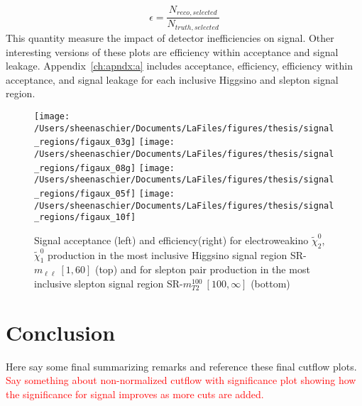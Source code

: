 \begin{equation}
\epsilon = \frac{N_{reco,selected}}{N_{truth,selected}}
\label{eq:efficiency}
\end{equation}
This quantity measure the impact of detector inefficiencies on signal.  Other interesting versions of these plots are efficiency within acceptance and signal leakage.  Appendix~\ref{ch:apndx:a} includes acceptance, efficiency, efficiency within acceptance, and signal leakage for each inclusive Higgsino and slepton signal region.
 \begin{figure}%
  \begin{center}
  \texttt{[image: /Users/sheenaschier/Documents/LaFiles/figures/thesis/signal\_regions/figaux\_03g]}
  \texttt{[image: /Users/sheenaschier/Documents/LaFiles/figures/thesis/signal\_regions/figaux\_08g]} 
   \texttt{[image: /Users/sheenaschier/Documents/LaFiles/figures/thesis/signal\_regions/figaux\_05f]}
      \texttt{[image: /Users/sheenaschier/Documents/LaFiles/figures/thesis/signal\_regions/figaux\_10f]}
   \end{center}
 \caption{Signal acceptance (left) and efficiency(right) for electroweakino $\tilde\chi_2^0$, $\tilde\chi_1^0$ production in the most inclusive Higgsino signal region SR-$m_{\ell\ell}~[1, 60]$ (top) and for slepton pair production in the most inclusive slepton signal region SR-$m^{100}_{T2}~[100, \infty]$ (bottom)}
 \label{fig:EWacceff}
 \end{figure}
 
 

\iffalse
\section{Conclusion}
\label{sec:concl}
Here say some final summarizing remarks and reference these final cutflow plots.  \textcolor{red}{Say something about non-normalized cutflow with significance plot showing how the significance for signal improves as more cuts are added.}

